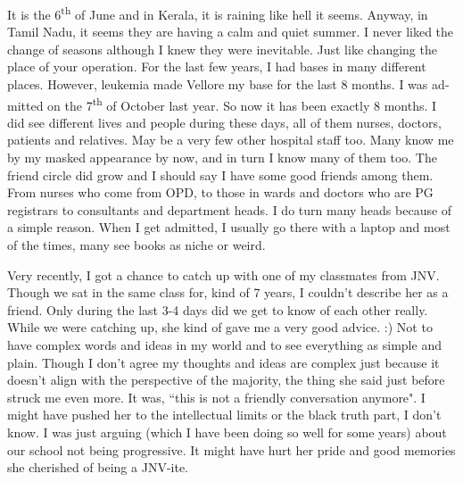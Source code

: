 \vskip 2pt
\begin{english}

It is the 6\textsuperscript{th} of June and in Kerala, it is raining like hell it seems. Anyway, in Tamil Nadu, it seems they are having a calm and quiet summer. I never liked the change of seasons although I knew they were inevitable. Just like changing the place of your operation. For the last few years, I had bases in many different places. However, leukemia made Vellore my base for the last 8 months. I was admitted on the 7\textsuperscript{th} of October last year. So now it has been exactly 8 months. I did see different lives and people during these days, all of them nurses, doctors, patients and relatives. May be a very few other hospital staff too. Many know me by my masked appearance by now, and in turn I know many of them too. The friend circle did grow and I should say I have some good friends among them. From nurses who come from OPD, to those in wards and doctors who are PG registrars to consultants and department heads. I do turn many heads because of a simple reason. When I get admitted, I usually go there with a laptop and most of the times, many see books as niche or weird. 

Very recently, I got a chance to catch up with one of my classmates from JNV. Though we sat in the same class for, kind of 7 years, I couldn't describe her as a friend. Only during the last 3-4 days did we get to know of each other really. While we were catching up, she kind of gave me a very good advice. :) Not to have complex words and ideas in my world and to see everything as simple and plain. Though I don't agree my thoughts and ideas are complex just because it doesn't align with the perspective of the majority, the thing she said just before struck me even more. It was, ``this is not a friendly conversation anymore". I might have pushed her to the intellectual limits or the black truth part, I don't know. I was just arguing (which I have been doing so well for some years) about our school not being progressive. It might have hurt her pride and good memories she cherished of being a JNV-ite.


\end{english}
